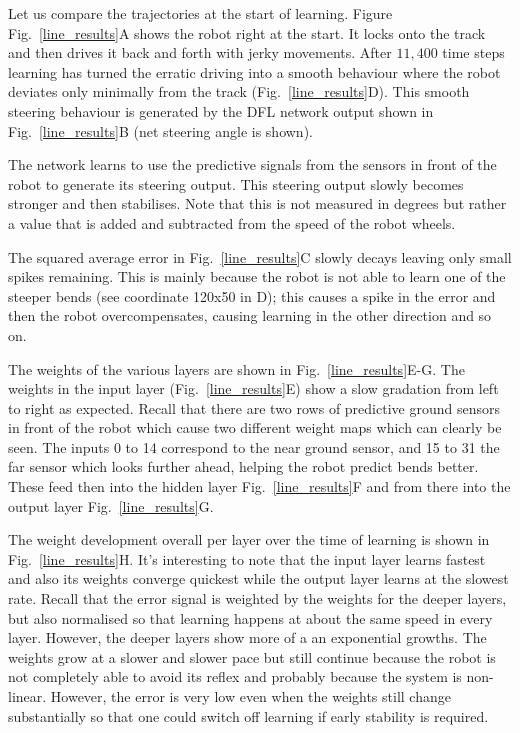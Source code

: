 \documentclass{llncs}
\begin{document}
Let us compare the trajectories at the start of learning. Figure
Fig.~\ref{line_results}A shows the robot right at the start. It locks
onto the track and then drives it back and forth with jerky
movements. After $11,400$ time steps learning has turned the erratic
driving into a smooth behaviour where the robot deviates only
minimally from the track (Fig.~\ref{line_results}D). This smooth
steering behaviour is generated by the DFL network output 
shown in Fig.~\ref{line_results}B (net steering angle is shown).

The network learns to use the predictive signals from the sensors in
front of the robot to generate its steering output.  This steering 
output slowly becomes stronger and
then stabilises. Note that this is not
measured in degrees but rather a value that is added and subtracted from the
speed of the robot wheels.

The squared average error in Fig.~\ref{line_results}C slowly decays
leaving only small spikes remaining. This is mainly because
the robot is not able to learn one of the steeper bends (see
coordinate 120x50 in D); this causes a spike in the error and
then the robot overcompensates, causing learning in the
other direction and so on.

The weights of the various layers are shown in
Fig.~\ref{line_results}E-G.  The weights in the input layer
(Fig.~\ref{line_results}E) show a slow gradation  from left to right as
expected. Recall that there are two rows of predictive ground
sensors in front of the robot which cause two different weight maps
which can clearly be seen. The inputs 0 to 14 correspond to the near
ground sensor, and 15 to 31 the far sensor which looks further ahead, 
helping the robot predict bends better. These feed then into the 
hidden layer Fig.~\ref{line_results}F
and from there into the output layer Fig.~\ref{line_results}G.

The weight development overall per layer over the time of learning
is shown in Fig.~\ref{line_results}H. It's interesting to note
that the input layer learns fastest and also its weights converge
quickest while the output layer learns at the slowest rate. Recall 
that the error signal is weighted by the weights for the deeper
layers, but also normalised so that learning happens at about the
same speed in every layer. However, the deeper layers show more
of a an exponential growths. The weights grow at a slower
and slower pace but still continue because the robot is not completely
able to avoid its reflex and probably because the system is non-linear.
However, the error is very low even when the weights still change
substantially so that one could switch off learning if early stability
is required.
\end{document}
